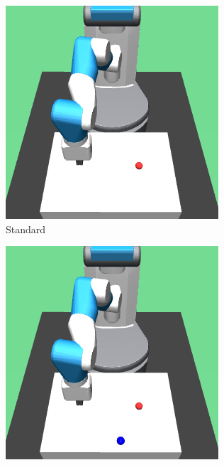 \begin{figure}
  \centering
  \begin{subfigure}{0.19\textwidth}
    \includegraphics[width=\textwidth]{figures/chapter6/test_observations/standard}
    \caption{Standard}
  \end{subfigure}
  \begin{subfigure}{0.19\textwidth}
    \includegraphics[width=\textwidth]{figures/chapter6/test_observations/colour_b}

\end{subfigure}
\end{figure}
